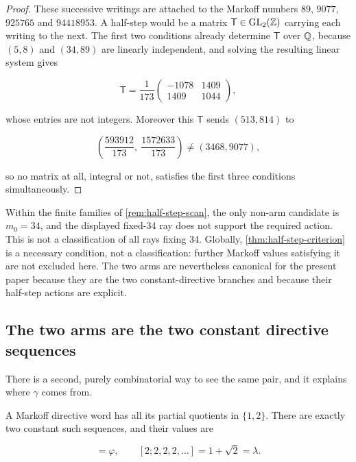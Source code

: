 \begin{proof}
These successive writings are attached to the Markoff
numbers $89$, $9077$, $925765$ and $94418953$. A half-step would be a matrix
$\mathsf T\in\mathrm{GL}_2(\mathbb{Z})$ carrying each writing to the next. The first
two conditions already determine $\mathsf T$ over $\mathbb{Q}$, because $(5,8)$ and
$(34,89)$ are linearly independent, and solving the resulting linear system
gives

\begin{equation}
 \mathsf T=\frac1{173}
 \begin{pmatrix}-1078&1409\\1409&1044\end{pmatrix},
\end{equation}

whose entries are not integers. Moreover this $\mathsf T$ sends
$(513,814)$ to

\begin{equation}
 \left(\frac{593912}{173},\ \frac{1572633}{173}\right)
 \ne(3468,9077),
\end{equation}

so no matrix at all, integral or not, satisfies the first three conditions
simultaneously.
\end{proof}

Within the finite families of \cref{rem:half-step-scan}, the only non-arm
candidate is $m_0=34$, and the displayed fixed-$34$ ray does not support the
required action. This is not a classification of all rays fixing $34$.
Globally, \cref{thm:half-step-criterion} is a necessary condition, not a
classification: further Markoff values satisfying it are not excluded here.
The two arms are nevertheless canonical for the present paper because they
are the two constant-directive branches and because their half-step actions
are explicit.

\subsection{The two arms are the two constant directive sequences}

There is a second, purely combinatorial way to see the same pair, and it
explains where $\gamma$ comes from.

A Markoff directive word has all its partial quotients in $\{1,2\}$. There
are exactly two constant such sequences, and their values are

\begin{equation}
 [1;1,1,1,\ldots]=\varphi,
 \qquad
 [2;2,2,2,\ldots]=1+\sqrt2=\lambda.
 \label{eq:constant-directives}
\end{equation}

